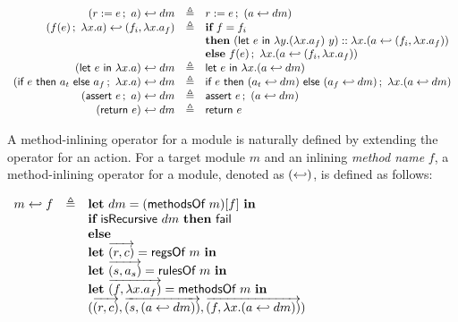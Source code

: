 \begin{definition}
  \label{def-inlinedm}
  \mbox{}
  \begin{center}
    \begin{math}
      \begin{array}{rcl}
        \inlinedm{(\actwrite{r}{e}{a})}{dm} & \triangleq &
        \actwrite{r}{e}{(\inlinedm{a}{dm})} \\
        \inlinedm{(\actcall{x}{f}{e}{a})}{(f_i, \lambda x.a_f)} & \triangleq &
        \pgmif{} f = f_i \\
        & & \pgmthen{} \concataction{(\actlet{e}{y}{(\lambda x.a_f)\ y})}{(\inlinedm{a}{(f_i, \lambda x.a_f)})} \\
        & & \pgmelse{} \actcall{x}{f}{e}{(\inlinedm{a}{(f_i, \lambda x.a_f)})} \\
        \inlinedm{(\actlet{e}{x}{a})}{dm} & \triangleq &
        \actlet{e}{x}{(\inlinedm{a}{dm})} \\
        \inlinedm{(\actifelse{e}{a_t}{a_f}{x}{a})}{dm} & \triangleq &
        \actifelse{e}{(\inlinedm{a_t}{dm})}{(\inlinedm{a_f}{dm})}{x}{(\inlinedm{a}{dm})} \\
        \inlinedm{(\actassert{e}{a})}{dm} & \triangleq &
        \actassert{e}{(\inlinedm{a}{dm})} \\
        \inlinedm{(\actret{e})}{dm} & \triangleq & \actret{e} \\
      \end{array}
    \end{math}
  \end{center}
\end{definition}

A method-inlining operator for a module is naturally defined by
extending the operator for an action. For a target module $m$ and an
inlining \emph{method name} $f$, a method-inlining operator for a
module, denoted as $(\inlinedmmsymb)$, is defined as follows:

\begin{definition}
  \label{def-inlinedmm}
  \mbox{}
  \begin{center}
    \begin{math}
      \begin{array}{rcl}
        \inlinedmm{m}{f} & \triangleq & \pgmlet{} dm = (\methsofm{m})[f]\ \pgmin{} \\
        & & \pgmif{} \isrec{dm}\ \pgmthen{} \fail{} \\
        & & \pgmelse{} \\
        & & \pgmlet{} \listof{\regpair{r}{c}} = \regsofm{m}\ \pgmin{} \\
        & & \pgmlet{} \listof{\rulepair{s}{a_s}} = \rulesofm{m}\ \pgmin{} \\
        & & \pgmlet{} \listof{\methodpair{f}{\lambda x.a_f}} = \methsofm{m}\ \pgmin{} \\
        & & \modbasic{\regpair{r}{c}}
                  {\rulepair{s}{(\inlinedm{a}{dm})}}
                  {\methodpair{f}{\lambda x.(\inlinedm{a}{dm})}} \\
      \end{array}
    \end{math}
  \end{center}
\end{definition}

